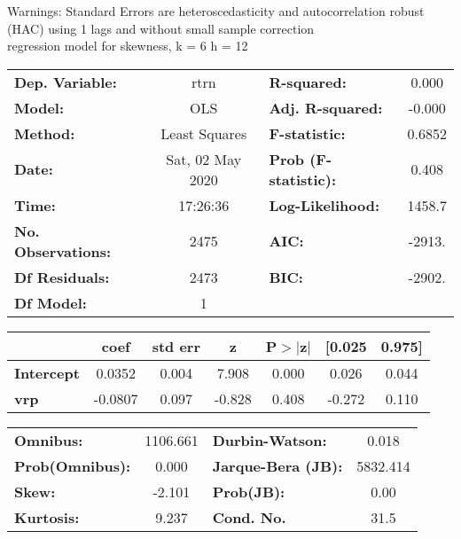 Warnings: \newline
 [1] Standard Errors are heteroscedasticity and autocorrelation robust (HAC) using 1 lags and without small sample correction\\ 

regression model for skewness, k = 6 h = 12\begin{center}
\begin{tabular}{lclc}
\toprule
\textbf{Dep. Variable:}    &       rtrn       & \textbf{  R-squared:         } &     0.000   \\
\textbf{Model:}            &       OLS        & \textbf{  Adj. R-squared:    } &    -0.000   \\
\textbf{Method:}           &  Least Squares   & \textbf{  F-statistic:       } &    0.6852   \\
\textbf{Date:}             & Sat, 02 May 2020 & \textbf{  Prob (F-statistic):} &    0.408    \\
\textbf{Time:}             &     17:26:36     & \textbf{  Log-Likelihood:    } &    1458.7   \\
\textbf{No. Observations:} &        2475      & \textbf{  AIC:               } &    -2913.   \\
\textbf{Df Residuals:}     &        2473      & \textbf{  BIC:               } &    -2902.   \\
\textbf{Df Model:}         &           1      & \textbf{                     } &             \\
\bottomrule
\end{tabular}
\begin{tabular}{lcccccc}
                   & \textbf{coef} & \textbf{std err} & \textbf{z} & \textbf{P$> |$z$|$} & \textbf{[0.025} & \textbf{0.975]}  \\
\midrule
\textbf{Intercept} &       0.0352  &        0.004     &     7.908  &         0.000        &        0.026    &        0.044     \\
\textbf{vrp}       &      -0.0807  &        0.097     &    -0.828  &         0.408        &       -0.272    &        0.110     \\
\bottomrule
\end{tabular}
\begin{tabular}{lclc}
\textbf{Omnibus:}       & 1106.661 & \textbf{  Durbin-Watson:     } &    0.018  \\
\textbf{Prob(Omnibus):} &   0.000  & \textbf{  Jarque-Bera (JB):  } & 5832.414  \\
\textbf{Skew:}          &  -2.101  & \textbf{  Prob(JB):          } &     0.00  \\
\textbf{Kurtosis:}      &   9.237  & \textbf{  Cond. No.          } &     31.5  \\
\bottomrule
\end{tabular}
\end{center}

